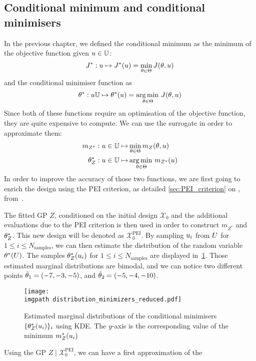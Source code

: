 \documentclass[../../Main_ManuscritThese.tex]{subfiles}
\newcommand\imgpath{/home/victor/acadwriting/Manuscrit/Text/Chapter5/img/}
\begin{document}
\subsection{Conditional minimum and conditional minimisers}
\label{ssec:croco_cond_minimum_minimisers}
In the previous chapter, we defined the conditional minimum as the
minimum of the objective function given $u\in \mathbb{U}$:
\begin{equation}
  J^* : u \mapsto J^*(u) = \min_{\theta\in\Theta} J(\theta, u)
\end{equation}
and the conditional minimiser function as
\begin{equation}
  \theta^*:u \mathbb{U} \mapsto \theta^*(u) = \operatorname*{arg\,min \,}_{\theta \in \Theta} J(\theta, u)
\end{equation}
Since both of these functions require an optimisation of the objective
function, they are quite expensive to compute. We can use the
surrogate in order to approximate them:
\begin{align}
  m_{Z^*}: u\in\mathbb{U} \mapsto &\min_{\theta \in \Theta} m_Z(\theta, u) \\
  \theta^*_{Z}: u \in \mathbb{U} \mapsto &\operatorname*{arg\,min \,}_{\theta \in \Theta} m_{Z^*}(u)
\end{align}
In order to improve the accuracy of those two functions, we are first
going to enrich the design using the PEI criterion, as detailed
\cref{sec:PEI_criterion} on ,
from~\cite{ginsbourger_bayesian_2014}.

The fitted GP $Z$, conditioned on the initial design $\mathcal{X}_0$
and the additional evaluations due to the PEI criterion is then used
in order to construct $m_{Z^*}$ and $\theta^*_Z$. This new design will be
denoted as $\mathcal{X}_0^{\mathrm{PEI}}$. By sampling $u_i$ from
$U$ for $1\leq i \leq N_{\mathrm{samples}}$, we can then estimate
the distribution of the random variable $\theta^*(U)$. The samples
$\theta^*_Z(u_i)$ for $1\leq i \leq N_{\mathrm{samples}}$ are displayed
in~\cref{fig:distrib_minimizers_reduced}. Those estimated marginal
distributions are bimodal, and we can notice two different points
$\hat{\theta}_1=(-7, -3, -5)$, and $\hat{\theta}_2=(-5, -4, -10)$.
\begin{figure}[ht]
  \centering
  \texttt{[image: \\imgpath distribution\_minimizers\_reduced.pdf]}
  \caption{\label{fig:distrib_minimizers_reduced}  Estimated marginal distributions of the conditional minimisers $\{\theta^*_Z(u_i)\}_i$ using KDE. The $y$-axis is the corresponding value of the minimum $m_Z^*(u_i)$}
\end{figure}
Using the GP $Z\mid \mathcal{X}_0^{\mathrm{PEI}}$, we can have a first
approximation of the
\end{document}
